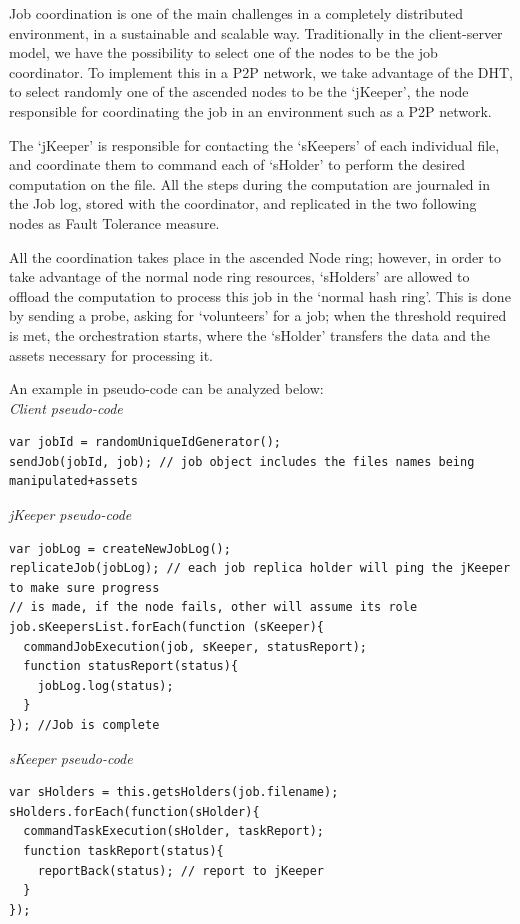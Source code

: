Job coordination is one of the main challenges in a completely distributed environment, in a sustainable and scalable way. Traditionally in the client-server model, we have the possibility to select one of the nodes to be the job coordinator. To implement this in a P2P network, we take advantage of the DHT, to select randomly one of the ascended nodes to be the `jKeeper', the node responsible for coordinating the job in an environment such as a P2P network.

The `jKeeper' is responsible for contacting the `sKeepers' of each individual file, and coordinate them to command each of `sHolder' to perform the desired computation on the file. All the steps during the computation are journaled in the Job log, stored with the coordinator, and replicated in the two following nodes as Fault Tolerance measure.

All the coordination takes place in the ascended Node ring; however, in order to take advantage of the normal node ring resources, `sHolders' are allowed to offload the computation to process this job in the `normal hash ring'. This is done by sending a probe, asking for `volunteers' for a job; when the threshold required is met, the orchestration starts, where the `sHolder' transfers the data and the assets necessary for processing it.

An example in pseudo-code can be analyzed below: \\

\textit{Client pseudo-code}
\begingroup
\scriptsize
\begin{verbatim}
var jobId = randomUniqueIdGenerator();
sendJob(jobId, job); // job object includes the files names being manipulated+assets
\end{verbatim}  
\endgroup



\textit{jKeeper pseudo-code}
\begingroup
\scriptsize
\begin{verbatim}
var jobLog = createNewJobLog();
replicateJob(jobLog); // each job replica holder will ping the jKeeper to make sure progress 
// is made, if the node fails, other will assume its role
job.sKeepersList.forEach(function (sKeeper){
  commandJobExecution(job, sKeeper, statusReport);
  function statusReport(status){
    jobLog.log(status);
  }  
}); //Job is complete
\end{verbatim}
\endgroup

\textit{sKeeper pseudo-code}
\begingroup
\scriptsize
\begin{verbatim}
var sHolders = this.getsHolders(job.filename);
sHolders.forEach(function(sHolder){
  commandTaskExecution(sHolder, taskReport);
  function taskReport(status){
    reportBack(status); // report to jKeeper
  }
});
\end{verbatim}
\endgroup

